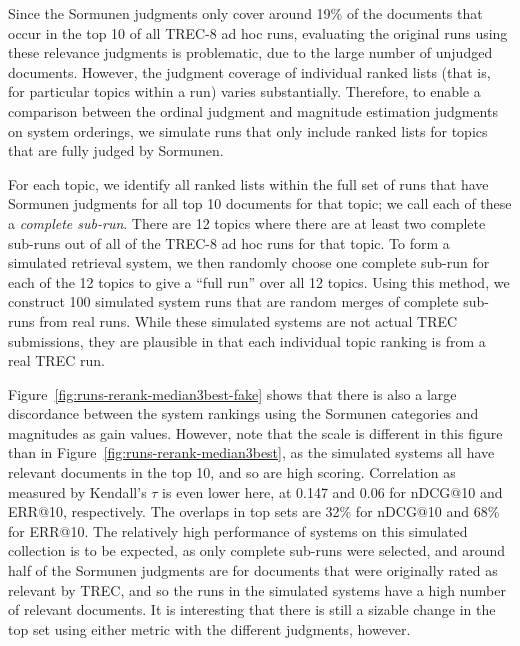 Since the Sormunen judgments only cover around 19\% of the documents
that occur in the top 10 of all TREC-8 ad hoc runs, evaluating the
original runs using these relevance judgments is problematic, due to
the large number of unjudged documents.
However, the judgment coverage of individual ranked lists (that is,
for particular topics within a run) varies substantially.
Therefore, to enable a comparison between the ordinal judgment and
magnitude estimation judgments on system orderings, we simulate 
runs that only include ranked lists for topics that are fully judged by
Sormunen.

For each topic, we identify all ranked lists within the full
set of runs that have Sormunen judgments for all top 10 documents for
that topic; we call each of these a 
\emph{complete sub-run}.
There are 12 topics where there are at least two complete sub-runs out of
all of the TREC-8 ad hoc runs for that topic.
To form a simulated retrieval system, we then randomly choose one
complete sub-run for each of the 12 topics to
give a ``full run'' over all 12 topics.
Using this method, we construct 100 simulated system runs that are
random merges of complete sub-runs from real 
runs.
While these simulated systems are not actual TREC submissions, they are
plausible in that each individual topic ranking is from a real TREC
run.

Figure~\ref{fig:runs-rerank-median3best-fake} shows that there is also a
large discordance between the system rankings using the Sormunen
categories and magnitudes as gain values.
However, note that the scale is different in this figure than in
Figure~\ref{fig:runs-rerank-median3best}, as the simulated systems all have
relevant documents in the top 10, and so are high scoring.
Correlation as measured by Kendall's $\tau$ is even lower here, at 0.147
and 0.06 for nDCG@10 and ERR@10, respectively.
The overlaps in top sets are 32\% for nDCG@10 and 68\% for ERR@10.
The relatively high performance of systems on this simulated collection
is to be expected, as only complete sub-runs were selected, and around
half of the Sormunen judgments are for documents that were originally
rated as relevant by TREC, and so the runs in the simulated systems
have a high number of relevant documents.
It is interesting that there is still a sizable change in the top
set using either metric with the different judgments, however.

